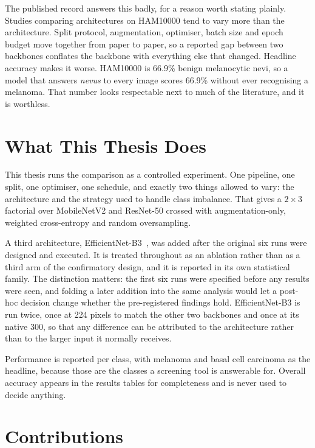 The published record answers this badly, for a reason worth stating plainly. Studies
comparing architectures on HAM10000 tend to vary more than the architecture. Split
protocol, augmentation, optimiser, batch size and epoch budget move together from paper
to paper, so a reported gap between two backbones conflates the backbone with everything
else that changed. Headline accuracy makes it worse. HAM10000 is 66.9\% benign
melanocytic nevi, so a model that answers \emph{nevus} to every image scores 66.9\%
without ever recognising a melanoma. That number looks respectable next to much of the
literature, and it is worthless.

\section{What This Thesis Does}

This thesis runs the comparison as a controlled experiment. One pipeline, one split, one
optimiser, one schedule, and exactly two things allowed to vary: the architecture and
the strategy used to handle class imbalance. That gives a $2\times3$ factorial over
MobileNetV2 and ResNet-50 crossed with augmentation-only, weighted cross-entropy and
random oversampling.

A third architecture, EfficientNet-B3~\cite{manole2024efficientnet}, was added after the
original six runs were designed and executed. It is treated throughout as an ablation
rather than as a third arm of the confirmatory design, and it is reported in its own
statistical family. The distinction matters: the first six runs were specified before
any results were seen, and folding a later addition into the same analysis would let a
post-hoc decision change whether the pre-registered findings hold. EfficientNet-B3 is run
twice, once at 224 pixels to match the other two backbones and once at its native 300,
so that any difference can be attributed to the architecture rather than to the larger
input it normally receives.

Performance is reported per class, with melanoma and basal cell carcinoma as the
headline, because those are the classes a screening tool is answerable for. Overall
accuracy appears in the results tables for completeness and is never used to decide
anything.

\section{Contributions}


